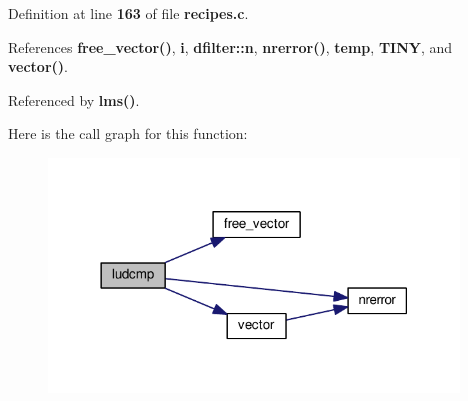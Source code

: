 Definition at line {\bf 163} of file {\bf recipes.\+c}.



References {\bf free\+\_\+vector()}, {\bf i}, {\bf dfilter\+::n}, {\bf nrerror()}, {\bf temp}, {\bf T\+I\+NY}, and {\bf vector()}.



Referenced by {\bf lms()}.



Here is the call graph for this function\+:
\nopagebreak
\begin{figure}[H]
\begin{center}
\leavevmode
\includegraphics[width=309pt]{db/de5/recipes_8c_a623fec796d9d53e5e4a4d30226547da7_cgraph}
\end{center}
\end{figure}




